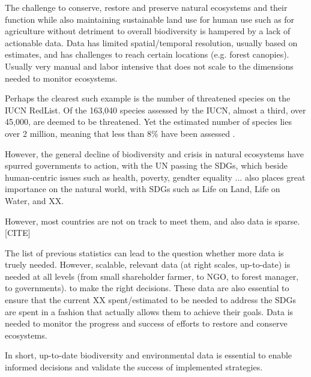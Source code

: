 The challenge to conserve, restore and preserve natural ecosystems and their function while also maintaining sustainable land use for human use such as for agriculture without detriment to overall biodiversity is hampered by a lack of actionable data. Data has limited spatial/temporal resolution, usually based on estimates, and has challenges to reach certain locations (e.g. forest canopies). Usually very manual and labor intensive that does not scale to the dimensions needed to monitor ecosystems. 

Perhaps the clearest such example is the number of threatened species on the IUCN RedList. Of the 163,040 species assessed by the IUCN, almost a third, over 45,000, are deemed to be threatened. Yet the estimated number of species lies over 2 million, meaning that less than 8\% have been assessed \cite{IUCN2024}.

However, the general decline of biodiversity and crisis in natural ecosystems have spurred governments to action, with the UN passing the SDGs, which beside human-centric issues such as health, poverty, gendter equality ... also places great importance on the natural world, with SDGs such as Life on Land, Life on Water, and XX.

However, most countries are not on track to meet them, and also data is sparse. [CITE]

The list of previous statistics can lead to the question whether more data is truely needed. However, scalable, relevant data (at right scales, up-to-date) is needed at all levels (from small shareholder farmer, to NGO, to forest manager, to governments). to make the right decisions. These data are also essential to ensure that the current XX spent/estimated to be needed to address the SDGs are spent in a fashion that actually allows them to achieve their goals. Data is needed to monitor the progress and success of efforts to restore and conserve ecosystems. 

In short, up-to-date biodiversity and environmental data is essential to enable informed decisions and validate the success of implemented strategies.

